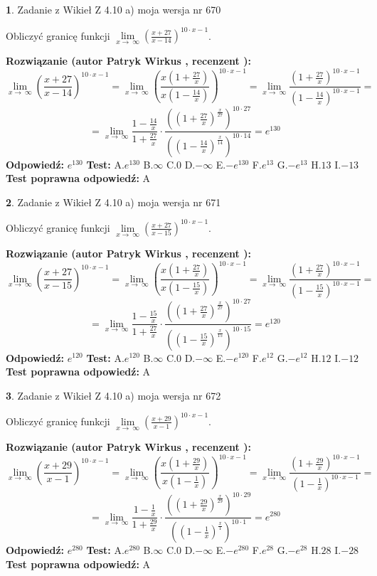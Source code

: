 \documentclass[12pt, a4paper]{article}
\theoremstyle{definition} %
\newtheorem{zad}{}
\newcommand{\zadStart}[1]{\begin{zad}#1\newline}
\newcommand{\zadStop}{\end{zad}}
\newcommand{\rozwStart}[2]{\noindent \textbf{Rozwiązanie (autor #1 , recenzent #2): }\newline}
\newcommand{\rozwStop}{\newline}
\newcommand{\odpStart}{\noindent \textbf{Odpowiedź:}\newline}
\newcommand{\odpStop}{\newline}
\newcommand{\testStart}{\noindent \textbf{Test:}\newline}
\newcommand{\testStop}{\newline}
\newcommand{\kluczStart}{\noindent \textbf{Test poprawna odpowiedź:}\newline}
\newcommand{\kluczStop}{\newline}
\begin{document}
\zadStart{Zadanie z Wikieł Z 4.10 a) moja wersja nr 670}

Obliczyć granicę funkcji  $\lim\limits_{x\to\ \infty}(\frac{x+27}{x-14})^{10\cdot x-1}$.
\zadStop
\rozwStart{Patryk Wirkus}{}
$$\lim\limits_{x\to\ \infty}(\frac{x+27}{x-14})^{10\cdot x-1} = \lim\limits_{x\to\ \infty}(\frac{x(1+\frac{27}{x})}{x(1-\frac{14}{x})})^{10\cdot x-1}=\lim\limits_{x\to\ \infty}\frac{(1+\frac{27}{x})^{10\cdot x-1}}{(1-\frac{14}{x})^{10\cdot x-1}}=$$
$$=\lim\limits_{x\to\ \infty}\frac{1-\frac{14}{x}}{1+\frac{27}{x}}\cdot\frac{((1+\frac{27}{x})^{\frac{x}{27}})^{10\cdot27}}{((1-\frac{14}{x})^{\frac{x}{14}})^{10\cdot14}}=e^{130}$$
\rozwStop
\odpStart
$e^{130}$
\odpStop
\testStart
A.$e^{130}$ B.$\infty$ C.$0$ D.$-\infty$ E.$-e^{130}$
F.$e^{13}$ G.$-e^{13}$
H.$13$
I.$-13$
\testStop
\kluczStart
A
\kluczStop



\zadStart{Zadanie z Wikieł Z 4.10 a) moja wersja nr 671}

Obliczyć granicę funkcji  $\lim\limits_{x\to\ \infty}(\frac{x+27}{x-15})^{10\cdot x-1}$.
\zadStop
\rozwStart{Patryk Wirkus}{}
$$\lim\limits_{x\to\ \infty}(\frac{x+27}{x-15})^{10\cdot x-1} = \lim\limits_{x\to\ \infty}(\frac{x(1+\frac{27}{x})}{x(1-\frac{15}{x})})^{10\cdot x-1}=\lim\limits_{x\to\ \infty}\frac{(1+\frac{27}{x})^{10\cdot x-1}}{(1-\frac{15}{x})^{10\cdot x-1}}=$$
$$=\lim\limits_{x\to\ \infty}\frac{1-\frac{15}{x}}{1+\frac{27}{x}}\cdot\frac{((1+\frac{27}{x})^{\frac{x}{27}})^{10\cdot27}}{((1-\frac{15}{x})^{\frac{x}{15}})^{10\cdot15}}=e^{120}$$
\rozwStop
\odpStart
$e^{120}$
\odpStop
\testStart
A.$e^{120}$ B.$\infty$ C.$0$ D.$-\infty$ E.$-e^{120}$
F.$e^{12}$ G.$-e^{12}$
H.$12$
I.$-12$
\testStop
\kluczStart
A
\kluczStop



\zadStart{Zadanie z Wikieł Z 4.10 a) moja wersja nr 672}

Obliczyć granicę funkcji  $\lim\limits_{x\to\ \infty}(\frac{x+29}{x-1})^{10\cdot x-1}$.
\zadStop
\rozwStart{Patryk Wirkus}{}
$$\lim\limits_{x\to\ \infty}(\frac{x+29}{x-1})^{10\cdot x-1} = \lim\limits_{x\to\ \infty}(\frac{x(1+\frac{29}{x})}{x(1-\frac{1}{x})})^{10\cdot x-1}=\lim\limits_{x\to\ \infty}\frac{(1+\frac{29}{x})^{10\cdot x-1}}{(1-\frac{1}{x})^{10\cdot x-1}}=$$
$$=\lim\limits_{x\to\ \infty}\frac{1-\frac{1}{x}}{1+\frac{29}{x}}\cdot\frac{((1+\frac{29}{x})^{\frac{x}{29}})^{10\cdot29}}{((1-\frac{1}{x})^{\frac{x}{1}})^{10\cdot1}}=e^{280}$$
\rozwStop
\odpStart
$e^{280}$
\odpStop
\testStart
A.$e^{280}$ B.$\infty$ C.$0$ D.$-\infty$ E.$-e^{280}$
F.$e^{28}$ G.$-e^{28}$
H.$28$
I.$-28$
\testStop
\kluczStart
A
\kluczStop
\end{document}
